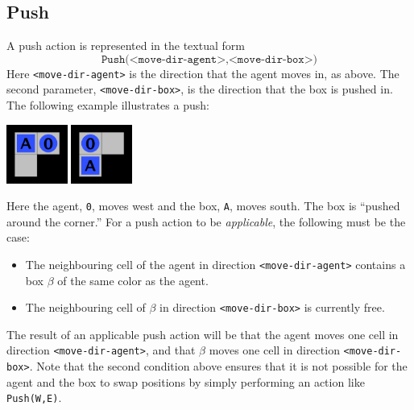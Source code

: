 \documentclass[12pt,a4paper]{article}
\begin{document}
\subsection{Push} A push action is represented in the textual form
    \[
        \texttt{Push(<move-dir-agent>,<move-dir-box>)}
    \]
    Here \texttt{<move-dir-agent>} is the direction that the agent moves in, as above. The second parameter, \texttt{<move-dir-box>}, is the direction that the box is pushed in. The following example illustrates a push:
    \begin{center}
       \includegraphics[width=2cm]{action_example1}  \quad
     \quad 
      \includegraphics[width=2cm]{action_example2}
    \end{center}
    Here the agent, \verb|0|, moves west and the box, \verb|A|, moves south. The box is ``pushed around the corner.'' For a push action to be \emph{applicable}, the following must be the case:
    \begin{itemize}
        \item The neighbouring cell of the agent in direction \texttt{<move-dir-agent>} contains a box $\beta$ of the same color as the agent.
        \item The neighbouring cell of $\beta$ in direction \texttt{<move-dir-box>} is currently free.
    \end{itemize}
    The result of an applicable push action will be that the agent moves one cell in direction \texttt{<move-dir-agent>}, and that $\beta$ moves one cell in direction \texttt{<move-dir-box>}. Note that the second condition above ensures that it is not possible for the agent and the box to swap positions by simply performing an action like \texttt{Push(W,E)}.
\end{document}
